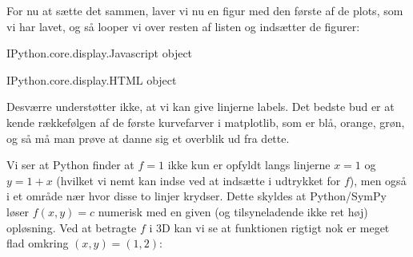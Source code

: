 \documentclass[letterpaper,10pt,english]{jupyterBook}
\begin{document}
For nu at sætte det sammen, laver vi nu en figur med den første af de plots, som vi har lavet, og så looper vi over resten af listen og indsætter de figurer:

\begin{sphinxVerbatim}[commandchars=\\\{\}]
  \PYG{p}{[}\PYG{p}{]}              

   \PYG{p}{[}\PYG{p}{]}
    \PYG{p}{[}\PYG{p}{]}
    
\end{sphinxVerbatim}

\begin{sphinxVerbatim}[commandchars=\\\{\}]
\PYGZlt{}IPython.core.display.Javascript object\PYGZgt{}
\end{sphinxVerbatim}

\begin{sphinxVerbatim}[commandchars=\\\{\}]
\PYGZlt{}IPython.core.display.HTML object\PYGZgt{}
\end{sphinxVerbatim}

Desværre understøtter  ikke, at vi kan give linjerne labels. Det bedste bud er at kende rækkefølgen af de første kurve\sphinxhyphen{}farver i matplotlib, som er blå, orange, grøn, og så må man prøve at danne sig et overblik ud fra dette.

Vi ser at Python finder at \(f=1\) ikke kun er opfyldt langs linjerne \(x = 1\) og \(y=1+x\) (hvilket vi nemt kan indse ved at indsætte i udtrykket for \(f\)), men også i et område nær hvor disse to linjer krydser. Dette skyldes at Python/SymPy løser \(f(x,y)=c\) numerisk med en given (og tilsyneladende ikke ret høj) opløsning. Ved at betragte \(f\) i 3D kan vi se at funktionen rigtigt nok er meget flad omkring \((x,y)=(1,2)\):

\begin{sphinxVerbatim}[commandchars=\\\{\}]
        
                
                
\end{sphinxVerbatim}
\end{document}
